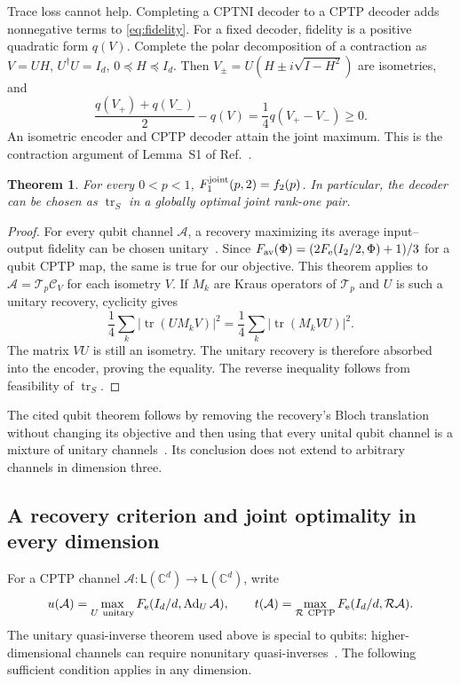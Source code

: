\documentclass[11pt]{article}
\newcommand{\tr}{\operatorname{tr}}
\newcommand{\T}{\mathcal T}
\newcommand{\R}{\mathcal R}
\newcommand{\C}{\mathcal C}
\newcommand{\F}{F_{\mathrm e}}
\newtheorem{theorem}{Theorem}
\begin{document}
Trace loss cannot help. Completing a CPTNI decoder to a CPTP decoder adds
nonnegative terms to \eqref{eq:fidelity}. For a fixed decoder, fidelity is a
positive quadratic form $q(V)$. Complete the polar decomposition of a
contraction as $V=UH$, $U^\dagger U=I_d$, $0\preceq H\preceq I_d$.
Then $V_\pm=U(H\pm i\sqrt{I-H^2})$ are isometries, and
\[
 \frac{q(V_+)+q(V_-)}2-q(V)=\frac14q(V_+-V_-)\ge0.
\]
An isometric encoder and CPTP decoder attain the joint maximum. This is the
contraction argument of Lemma~S1 of Ref.~\cite{LiJiang}.

\begin{theorem}\label{thm:qubit}
For every $0<p<1$, $F_1^{\rm joint}(p,2)=f_2(p)$.
In particular, the decoder can be chosen as $\tr_S$ in a globally optimal
joint rank-one pair.
\end{theorem}
\begin{proof}
For every qubit channel $\mathcal A$, a recovery maximizing its average
input--output fidelity can be chosen unitary~\cite[Theorem~1]{KBF}.
Since $F_{\rm av}(\Phi)=(2\F(I_2/2,\Phi)+1)/3$ for a qubit CPTP map,
the same is true for our objective. This theorem applies to
$\mathcal A=\T_p\C_V$ for each isometry $V$. If $M_k$ are Kraus
operators of $\T_p$ and $U$ is such a unitary recovery, cyclicity gives
\[
 \frac14\sum_k|\tr(UM_kV)|^2
 =\frac14\sum_k|\tr(M_kVU)|^2.
\]
The matrix $VU$ is still an isometry. The unitary recovery is therefore
absorbed into the encoder, proving the equality. The reverse inequality
follows from feasibility of $\tr_S$.
\end{proof}
The cited qubit theorem follows by removing the recovery's Bloch translation
without changing its objective and then using that every unital qubit channel
is a mixture of unitary channels~\cite[Appendix~A]{KBF}. Its conclusion does
not extend to arbitrary channels in dimension three.

\subsection{A recovery criterion and joint optimality in every dimension}
For a CPTP channel $\mathcal A:\mathsf L(\mathbb C^d)\to
\mathsf L(\mathbb C^d)$, write
\[
 u(\mathcal A)=\max_{U\ {\rm unitary}}\F(I_d/d,\operatorname{Ad}_U\mathcal A),
 \qquad
 t(\mathcal A)=\max_{\R\ {\rm CPTP}}\F(I_d/d,\R\mathcal A).
\]
The unitary quasi-inverse theorem used above is special to qubits:
higher-dimensional channels can require nonunitary quasi-inverses~\cite{SSMZK}.
The following sufficient condition applies in any dimension.
\end{document}
